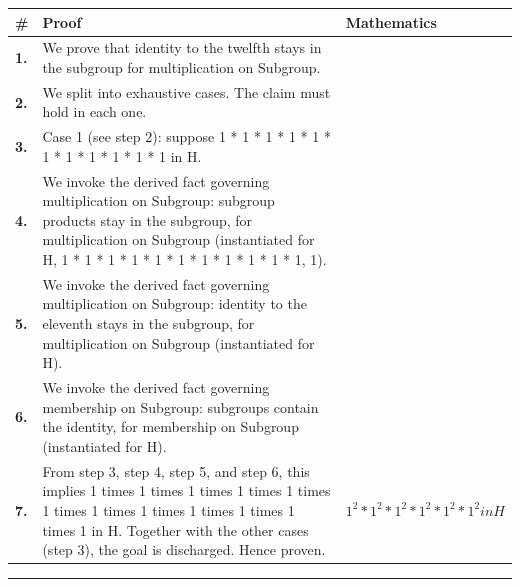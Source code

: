 \documentclass[11pt]{article}
\theoremstyle{definition}
\begin{document}
\begin{tabular}{@{} >{\raggedright\arraybackslash}p{} >{\raggedright\arraybackslash}p{} >{\raggedleft\arraybackslash}p{} @{}}
\textbf{\#} & \textbf{Proof} & \textbf{Mathematics} \\
\midrule
\textbf{1.} & We prove that identity to the twelfth stays in the subgroup for multiplication on Subgroup. & \\[0.45em]
\textbf{2.} & We split into exhaustive cases. The claim must hold in each one. & \\[0.45em]
\textbf{3.} & Case 1 (see step 2): suppose 1 * 1 * 1 * 1 * 1 * 1 * 1 * 1 * 1 * 1 * 1 in H. & \\[0.45em]
\textbf{4.} & We invoke the derived fact governing multiplication on Subgroup: subgroup products stay in the subgroup, for multiplication on Subgroup (instantiated for H, 1 * 1 * 1 * 1 * 1 * 1 * 1 * 1 * 1 * 1 * 1, 1). & \\[0.45em]
\textbf{5.} & We invoke the derived fact governing multiplication on Subgroup: identity to the eleventh stays in the subgroup, for multiplication on Subgroup (instantiated for H). & \\[0.45em]
\textbf{6.} & We invoke the derived fact governing membership on Subgroup: subgroups contain the identity, for membership on Subgroup (instantiated for H). & \\[0.45em]
\textbf{7.} & From step 3, step 4, step 5, and step 6, this implies 1 times 1 times 1 times 1 times 1 times 1 times 1 times 1 times 1 times 1 times 1 times 1 in H. Together with the other cases (step 3), the goal is discharged. Hence proven. & $\displaystyle 1^{2} * 1^{2} * 1^{2} * 1^{2} * 1^{2} * 1^{2} in H$ \\[0.45em]
\bottomrule
\end{tabular}
\label{thm:Subgroup-multiplication-identity_to_the_twelfth_stays_in_the_subgroup}
\par\medskip\hrule
\end{document}
